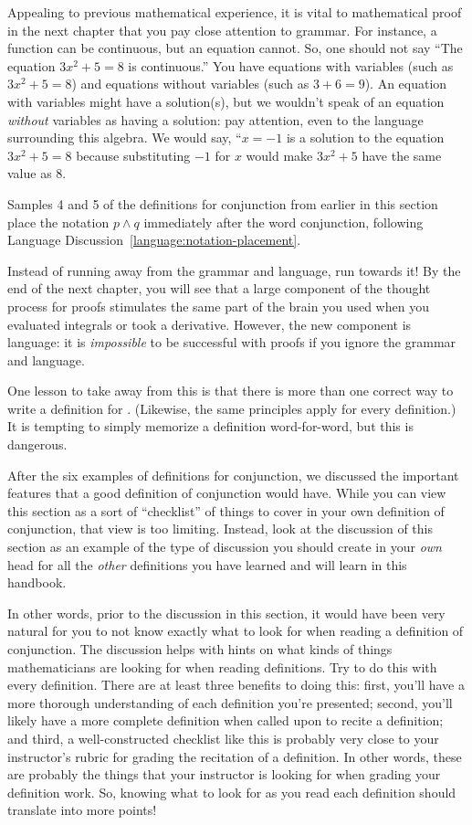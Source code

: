 \documentclass{book}
\theoremstyle{ekimcustom}
\newcommand\defn[1]{{\color{blue}{\bf #1}}}
\begin{document}
Appealing to previous mathematical experience, it is vital to mathematical proof in the next chapter that you pay close attention to grammar. For instance, a function can be continuous, but an equation cannot. So, one should not say ``The equation $3x^2 + 5 =8$ is continuous.'' You have equations with variables (such as $3x^2+5=8$) and equations without variables (such as $3+6=9$). An equation with variables might have a solution(s), but we wouldn't speak of an equation \emph{without} variables as having a solution: pay attention, even to the language surrounding this algebra. We would say, ``$x=-1$ is a solution to the equation $3x^2+5=8$ because substituting $-1$ for $x$ would make $3x^2+5$ have the same value as $8$.

Samples 4 and 5 of the definitions for conjunction from earlier in this section place the notation $p \wedge q$ immediately after the word conjunction, following Language Discussion~\ref{language:notation-placement}.

Instead of running away from the grammar and language, run towards it! By the end of the next chapter, you will see that a large component of the thought process for proofs stimulates the same part of the brain you used when you evaluated integrals or took a derivative. However, the new component is language: it is \emph{impossible} to be successful with proofs if you ignore the grammar and language.

One lesson to take away from this is that there is more than one correct way to write a definition for \defn{conjunction}. (Likewise, the same principles apply for every definition.) It is tempting to simply memorize a definition word-for-word, but this is dangerous.

After the six examples of definitions for conjunction, we discussed the important features that a good definition of conjunction would have. While you can view this section as a sort of ``checklist'' of things to cover in your own definition of conjunction, that view is too limiting. Instead, look at the discussion of this section as an example of the type of discussion you should create in your \emph{own} head for all the \emph{other} definitions you have learned and will learn in this handbook.

In other words, prior to the discussion in this section, it would have been very natural for you to not know exactly what to look for when reading a definition of conjunction. The discussion helps with hints on what kinds of things mathematicians are looking for when reading definitions. Try to do this with every definition. There are at least three benefits to doing this: first, you'll have a more thorough understanding of each definition you're presented; second, you'll likely have a more complete definition when called upon to recite a definition; and third, a well-constructed checklist like this is probably very close to your instructor's rubric for grading the recitation of a definition. In other words, these are probably the things that your instructor is looking for when grading your definition work. So, knowing what to look for as you read each definition should translate into more points!
\end{document}
